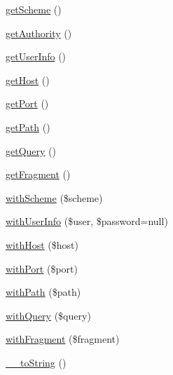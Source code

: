 \begin{DoxyCompactItemize}
\item 
\hyperlink{interfacePsr_1_1Http_1_1Message_1_1UriInterface_a12b7d87a6b448aaf0cb4978029dc5ecc}{get\+Scheme} ()
\item 
\hyperlink{interfacePsr_1_1Http_1_1Message_1_1UriInterface_a2c32fd7d98677e1fb5d31d6d24ad937a}{get\+Authority} ()
\item 
\hyperlink{interfacePsr_1_1Http_1_1Message_1_1UriInterface_aa19d2f6ab55d87aa607bfca6995f9923}{get\+User\+Info} ()
\item 
\hyperlink{interfacePsr_1_1Http_1_1Message_1_1UriInterface_a5dbe0ede7395fd19fca8fafe023aa285}{get\+Host} ()
\item 
\hyperlink{interfacePsr_1_1Http_1_1Message_1_1UriInterface_aa6738a90dce8e99c3b0fc6a73f34cd62}{get\+Port} ()
\item 
\hyperlink{interfacePsr_1_1Http_1_1Message_1_1UriInterface_aa50072ff08f6acf7c35aa5ebd0ae91cd}{get\+Path} ()
\item 
\hyperlink{interfacePsr_1_1Http_1_1Message_1_1UriInterface_a859c8c892d038ba2f1a92b1dfa806ecc}{get\+Query} ()
\item 
\hyperlink{interfacePsr_1_1Http_1_1Message_1_1UriInterface_a95df80b1a48010817c8c135ef5d9d5b1}{get\+Fragment} ()
\item 
\hyperlink{interfacePsr_1_1Http_1_1Message_1_1UriInterface_af1eb8a046537a32fe08bc90f6debb9c6}{with\+Scheme} (\$scheme)
\item 
\hyperlink{interfacePsr_1_1Http_1_1Message_1_1UriInterface_aeee034680ed8e5066fb6b2c671a2005f}{with\+User\+Info} (\$user, \$password=null)
\item 
\hyperlink{interfacePsr_1_1Http_1_1Message_1_1UriInterface_a464c2a4012d692b96500ff4eca7e3cb1}{with\+Host} (\$host)
\item 
\hyperlink{interfacePsr_1_1Http_1_1Message_1_1UriInterface_aed81cb605b9bec89404a78ff550125a5}{with\+Port} (\$port)
\item 
\hyperlink{interfacePsr_1_1Http_1_1Message_1_1UriInterface_a9d2a8bda965816471ea40e3560d710ca}{with\+Path} (\$path)
\item 
\hyperlink{interfacePsr_1_1Http_1_1Message_1_1UriInterface_a66f1ac4196c69ab824c408e2d6e89b10}{with\+Query} (\$query)
\item 
\hyperlink{interfacePsr_1_1Http_1_1Message_1_1UriInterface_a637020abdaa77e0c60a2377172395bf1}{with\+Fragment} (\$fragment)
\item 
\hyperlink{interfacePsr_1_1Http_1_1Message_1_1UriInterface_a322566ef8139a72e4a3da1feffafb1e6}{\+\_\+\+\_\+to\+String} ()
\end{DoxyCompactItemize}


